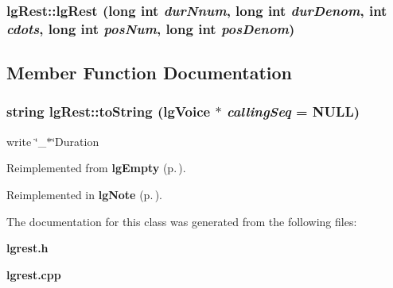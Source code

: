 \subsubsection{\setlength{\rightskip}{0pt plus 5cm}lg\-Rest::lg\-Rest (long int {\em dur\-Nnum}, long int {\em dur\-Denom}, int {\em cdots}, long int {\em pos\-Num}, long int {\em pos\-Denom})}\label{classlgRest_a1}




\subsection{Member Function Documentation}
\subsubsection{\setlength{\rightskip}{0pt plus 5cm}string lg\-Rest::to\-String ({\bf lg\-Voice} $\ast$ {\em calling\-Seq} = NULL)\hspace{0.3cm}{\tt  [virtual]}}\label{classlgRest_a0}


write \char`\"{}\_\-$\ast$\char`\"{}Duration 



Reimplemented from {\bf lg\-Empty} {\rm (p.\,\pageref{classlgEmpty_a0})}.

Reimplemented in {\bf lg\-Note} {\rm (p.\,\pageref{classlgNote_a0})}.

The documentation for this class was generated from the following files:\begin{CompactItemize}
\item 
{\bf lgrest.h}\item 
{\bf lgrest.cpp}\end{CompactItemize}
